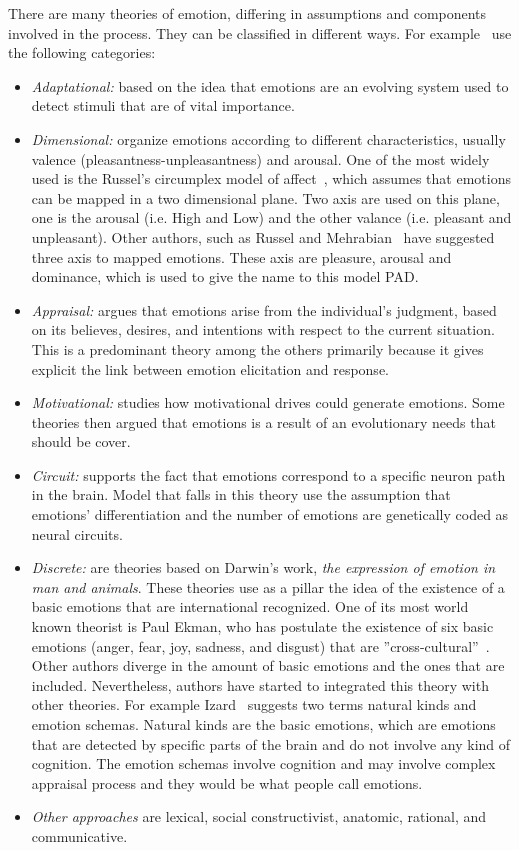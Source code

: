 There are many theories of emotion, differing in assumptions and components involved in the process. They can be classified in different ways. For example~\cite{Scherer2010,marsella_computational_2010} use the following categories:
\begin{itemize}
	\item \textit{Adaptational:} based on the idea that emotions are an evolving system used to detect stimuli that are of vital importance.
	\item \textit{Dimensional:} organize emotions according to different characteristics, usually valence (pleasantness-unpleasantness) and arousal. One of the most widely used is the Russel's circumplex model of affect~\cite{Russell1980}, which assumes that emotions can be mapped in a two dimensional plane. Two axis are used on this plane, one is the arousal (i.e. High and Low) and the other valance (i.e. pleasant and unpleasant). Other authors, such as Russel and Mehrabian~\cite{mehrabian1974approach} have suggested three axis to mapped emotions. These axis are pleasure, arousal and dominance, which is used to give the name to this model PAD. 
	\item \textit{Appraisal:} argues that emotions arise from the individual's judgment, based on its believes, desires, and intentions with respect to the current situation. This is a predominant theory among the others primarily because it gives explicit the link between emotion elicitation and response. 
	\item \textit{Motivational:} studies how motivational drives could generate emotions. Some theories then argued that emotions is a result of an evolutionary needs that should be cover.
	\item \textit{Circuit:} supports the fact that emotions correspond to a specific neuron path in the brain. Model that falls in this theory use the assumption that emotions' differentiation and the number of emotions are genetically coded as neural circuits.
	\item \textit{Discrete:} are theories based on Darwin's work, \textit{the expression of emotion in man and animals}. These theories use as a pillar the idea of the existence of a basic emotions that are international recognized. One of its most world known theorist is Paul Ekman, who has postulate the existence of six basic emotions (anger, fear, joy, sadness, and disgust) that are ''cross-cultural''~\cite{Ekman2004}. Other authors diverge in the amount of basic emotions and the ones that are included. Nevertheless, authors have started to integrated this theory with other theories. For example Izard~\cite{Izard2007} suggests two terms natural kinds and emotion schemas. Natural kinds are the basic emotions, which are emotions that are detected by specific parts of the brain and do not involve any kind of cognition. The emotion schemas involve cognition and may involve complex appraisal process and they would be what people call emotions.
	\item \textit{Other approaches} are lexical, social constructivist, anatomic, rational, and communicative.
\end{itemize}
